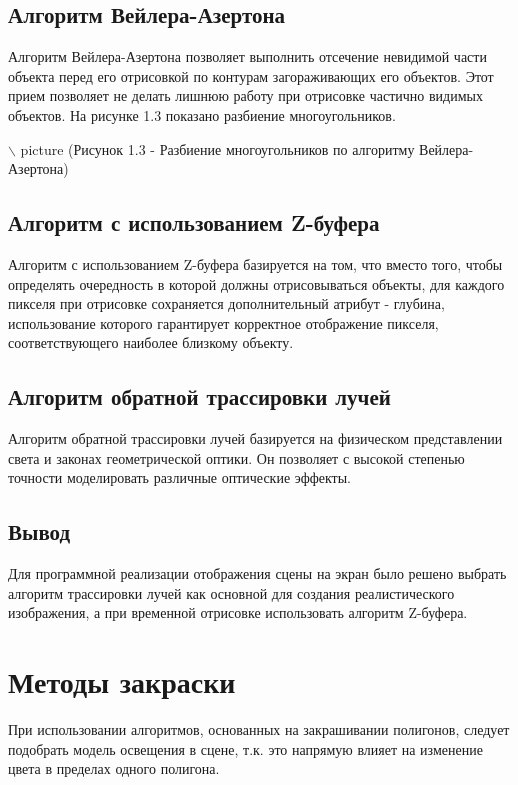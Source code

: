 \subsection{Алгоритм Вейлера-Азертона}

Алгоритм Вейлера-Азертона позволяет выполнить отсечение невидимой части объекта перед его отрисовкой по контурам загораживающих его объектов. Этот прием позволяет не делать лишнюю работу при отрисовке частично видимых объектов. На рисунке 1.3 показано разбиение многоугольников.

$\backslash$ picture (Рисунок 1.3 - Разбиение многоугольников по алгоритму Вейлера-Азертона)

\subsection{Алгоритм с использованием Z-буфера}

Алгоритм с использованием Z-буфера базируется на том, что вместо того, чтобы определять очередность в которой должны отрисовываться объекты, для каждого пикселя при отрисовке сохраняется дополнительный атрибут - глубина, использование которого гарантирует корректное отображение пикселя, соответствующего наиболее близкому объекту.

\subsection{Алгоритм обратной трассировки лучей}

Алгоритм обратной трассировки лучей базируется на физическом представлении света и законах геометрической оптики. Он позволяет с высокой степенью точности моделировать различные оптические эффекты.

\subsection{Вывод}

Для программной реализации отображения сцены на экран было решено выбрать алгоритм трассировки лучей как основной для создания реалистического изображения, а при временной отрисовке использовать алгоритм Z-буфера.

\section{Методы закраски}

При использовании алгоритмов, основанных на закрашивании полигонов, следует подобрать модель освещения в сцене, т.к. это напрямую влияет на изменение цвета в пределах одного полигона.

